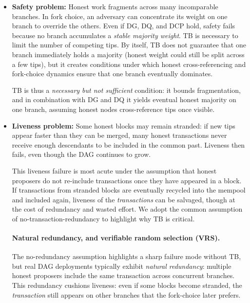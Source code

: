\begin{itemize}
  \item \textbf{Safety problem:} Honest work fragments across many incomparable
  branches. In fork choice, an adversary can concentrate its weight on one branch
  to override the others. Even if DG, DQ, and DCP hold, safety fails because no
  branch accumulates a \emph{stable majority weight}. TB is necessary to limit
  the number of competing tips. By itself, TB does not guarantee that one branch
  immediately holds a majority (honest weight could still be split across a few
  tips), but it creates conditions under which honest cross-referencing and
  fork-choice dynamics ensure that one branch eventually dominates.
  \begin{remark}
  TB is thus a \emph{necessary but not sufficient} condition: it bounds
  fragmentation, and in combination with DG and DQ it yields eventual honest
  majority on one branch, assuming honest nodes cross-reference tips once visible.
  \end{remark}

  \item \textbf{Liveness problem:} Some honest blocks may remain stranded: if new
  tips appear faster than they can be merged, many honest transactions never
  receive enough descendants to be included in the common past. Liveness then
  fails, even though the DAG continues to grow.
  \begin{remark}
  This liveness failure is most acute under the assumption that honest proposers
  do not re-include transactions once they have appeared in a block. If
  transactions from stranded blocks are eventually recycled into the mempool and
  included again, liveness of the \emph{transactions} can be salvaged, though at
  the cost of redundancy and wasted effort. We adopt the common assumption of
  no-transaction-redundancy to highlight why TB is critical.
  \end{remark}
  
\paragraph{Natural redundancy, and verifiable random selection (VRS).}
The no-redundancy assumption highlights a sharp failure mode without TB, but real DAG deployments
typically exhibit \emph{natural redundancy}: multiple honest proposers include the same transaction across
concurrent branches. This redundancy cushions liveness: even if some blocks become stranded, the \emph{transaction}
still appears on other branches that the fork-choice later prefers.


\end{itemize}
